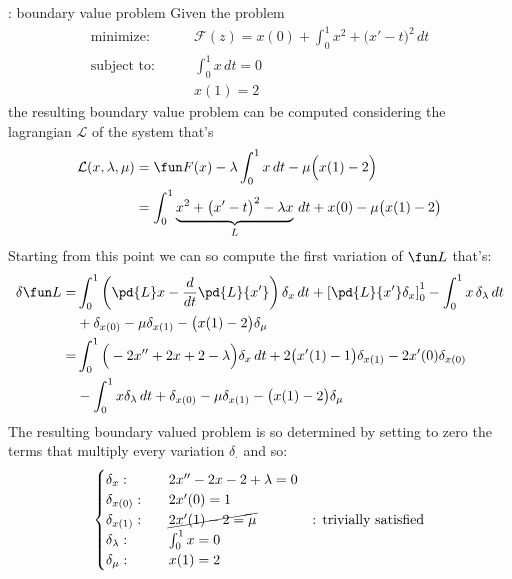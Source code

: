\begin{example}{: boundary value problem}
	Given the problem	
	\begin{align*} 
		\textrm{minimize:}& \qquad \mathcal F(z) = x(0) + \int_0^1 x^2 + \big(x'-t\big)^2\, dt \\
		\textrm{subject to:}& \qquad \int_0^1 x\, dt = 0 \\ & \qquad x(1) = 2
	\end{align*}
	the resulting boundary value problem can be computed considering the lagrangian $\mathcal L$ of the system that's
	\begin{align*}
		\mathcal L(x,\lambda,\mu) & = \fun F(x) -\lambda \int_0^1 x\, dt - \mu\Big(x(1)-2\Big) \\
		& = \int_0^1 \underbrace{x^2 + \big(x'-t\big)^2 - \lambda x}_{L}\, dt + x(0) - \mu\big(x(1)-2\big)
	\end{align*}
	Starting from this point we can so compute the first variation of $\fun L$ that's:
	\begin{align*}
		\delta \fun L = & \int_0^1 \left( \pd { L} x - \frac d {dt} \pd{ L}{x'} \right) \delta_x\, dt + \left[ \pd{L}{x'} \delta_x \right]_0^1  - \int_0^1 x\, \delta_\lambda \, dt \\ & + \delta_{x(0)} - \mu \delta_{x(1)} - \big( x(1) - 2 \big) \delta_\mu \\
		= & \int_0^1 \Big( -2x''  + 2x +2 -\lambda \Big) \delta_x\, dt + 2\big(x'(1) - 1\big)\delta_{x(1)} - 2 x'(0) \delta_{x(0)} \\ & - \int_0^1 x \delta_\lambda\, dt + \delta_{x(0)} - \mu  \delta_{x(1)} - \big(x(1)-2\big) \delta_\mu
	\end{align*}
	The resulting boundary valued problem is so determined by setting to zero the terms that multiply every variation $\delta_\cdot$ and so:
	\[ \begin{cases}
		\delta_x: \qquad & 2 x'' - 2x - 2 + \lambda = 0 \\
		\delta_{x(0)} : & 2x'(0) = 1 \\
		\delta_{x(1)} : & \cancel{2x'(1) - 2 = \mu} \qquad \qquad \textrm{: trivially satisfied} \\
		\delta_\lambda: & \int_0^1 x = 0 \\
		\delta_\mu: & x(1) = 2 \\

	\end{cases} \]
	
\end{example}

